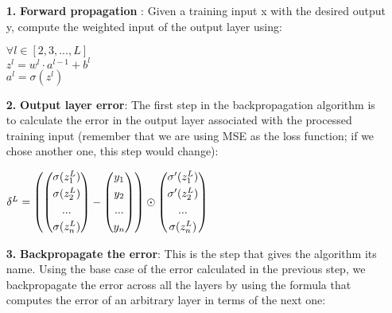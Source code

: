 \documentclass[../main]{subfiles}
\begin{document}
\begin{itemize}
    \item[\textbf{1.}] \textbf{Forward propagation }: Given a training input x with the desired output y, compute the weighted input of the output layer using:
    \begin{center}
        $\forall l \in [2, 3, ..., L]$ \\ \vspace{1.5mm}
        $z^l=w^l\cdot a^{l-1}+b^l$ \\ \vspace{1mm}
        $a^l = \sigma(z^l)$
    \end{center}
    \item[\textbf{2.}] \textbf{Output layer error}: The first step in the backpropagation algorithm is to calculate the error in the output layer associated with the processed training input (remember that we are using MSE as the loss function; if we chose another one, this step would change):
    \begin{center}
        $\delta^L = \left(\begin{pmatrix}
\sigma(z_{1}^L)\vspace{0.1cm}\\ 
\sigma(z_{2}^L)\vspace{0.1cm}\\ 
...\vspace{0.1cm}\\
\sigma(z_{n}^L)
\end{pmatrix}-\begin{pmatrix}
y_1\vspace{0.1cm}\\ 
y_2\vspace{0.1cm}\\ 
...\vspace{0.1cm}\\
y_n
\end{pmatrix}\right)\odot\begin{pmatrix}
\sigma'(z_{1}^L)\vspace{0.1cm}\\ 
\sigma'(z_{2}^L)\vspace{0.1cm}\\ 
...\vspace{0.1cm}\\
\sigma(z_{n}^L)
\end{pmatrix}$
    \end{center}
    \item[\textbf{3.}] \textbf{Backpropagate the error}: This is the step that gives the algorithm its name. Using the base case of the error calculated in the previous step, we backpropagate the error across all the layers by using the formula that computes the error of an arbitrary layer in terms of the next one:

\end{itemize}
\end{document}
